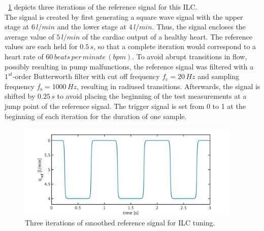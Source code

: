 \figurename~\ref{fig:ref_signal_ILC3} depicts three iterations of the reference signal for this ILC.
\\The signal is created by first generating a square wave signal with the upper stage at $6\, l/min$ and the lower stage at $4\, l/min$. Thus, the signal encloses the average value of $5\, l/min$ of the cardiac output of a healthy heart. The reference values are each held for $0.5\, s$, so that a complete iteration would correspond to a heart rate of $60\, beats\, per\, minute\, (bpm)$. To avoid abrupt transitions in flow, possibly resulting in pump malfunctions, the reference signal was filtered with a $1^{st}$-order Butterworth filter with cut off frequency $f_{\mathrm{c}}=20\,Hz$ and sampling frequency $f_{\mathrm{s}}=1000\,Hz$, resulting in radiused transitions. Afterwards, the signal is shifted by $0.25\, s$ to avoid placing the beginning of the test measurements at a jump point of the reference signal. The trigger signal is set from 0 to 1 at the beginning of each iteration for the duration of one sample.
\begin{figure}[ht]
  \centering
  \includegraphics[width=0.95\textwidth]{images/chapt_5/ILC/ref_signal_ILC3.pdf}
  \caption[Smoothed reference signal for ILC tuning]{Three iterations of smoothed reference signal for ILC tuning.}
  \label{fig:ref_signal_ILC3}
\end{figure}

